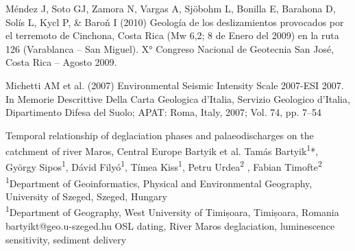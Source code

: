 {Méndez J, Soto GJ, Zamora N, Vargas A, Sjöbohm L, Bonilla E, Barahona D, Solís L, Kycl P, \& Baroň I (2010) Geología de los deslizamientos provocados por el terremoto de Cinchona, Costa Rica (Mw 6,2; 8 de Enero del 2009) en la ruta 126 (Varablanca – San Miguel). X° Congreso Nacional de Geotecnia  San José, Costa Rica -- Agosto 2009.

Michetti AM et al. (2007) Environmental Seismic Intensity Scale 2007-ESI 2007. In Memorie Descrittive Della Carta Geologica d’Italia, Servizio Geologico d’Italia, Dipartimento Difesa del Suolo; APAT: Roma, Italy, 2007; Vol. 74, pp. 7--54
}

\abstract
{Temporal relationship of deglaciation phases and palaeodischarges on the catchment of river Maros, Central Europe} %
{Bartyik et al.} %
{Tamás Bartyik\textsuperscript{1}*, György Sipos\textsuperscript{1}, Dávid Filyó\textsuperscript{1}, Tímea Kiss\textsuperscript{1}, Petru Urdea\textsuperscript{2} , Fabian Timofte\textsuperscript{2}} %
{\TLtag} %
{\textsuperscript{1}Department of Geoinformatics, Physical and Environmental Geography, University of Szeged, Szeged, Hungary\\
\textsuperscript{1}Department of Geography, West University of Timișoara, Timișoara, Romania
} %
{bartyikt@geo.u-szeged.hu}  %
{OSL dating, River Maros deglaciation, luminescence sensitivity, sediment delivery}%
